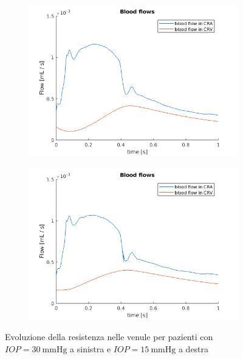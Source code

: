 \documentclass{article}
\begin{document}
\begin{figure}[h]
\begin{subfigure}{.5\textwidth}
  \centering
  \includegraphics[width=1.0\linewidth]{Pictures/IOP30_part1/BF_30.png}
\end{subfigure}
\begin{subfigure}{.5\textwidth}
  \centering
  \includegraphics[width=1.0\linewidth]{Pictures/IOP15_part1/BF_15.png}
\end{subfigure}
\caption{Evoluzione della resistenza nelle venule per pazienti con $IOP = \SI{30}{\mmHg}$ a sinistra e $IOP = \SI{15}{\mmHg}$ a destra}
\label{flusso1530}
\end{figure}
\end{document}
